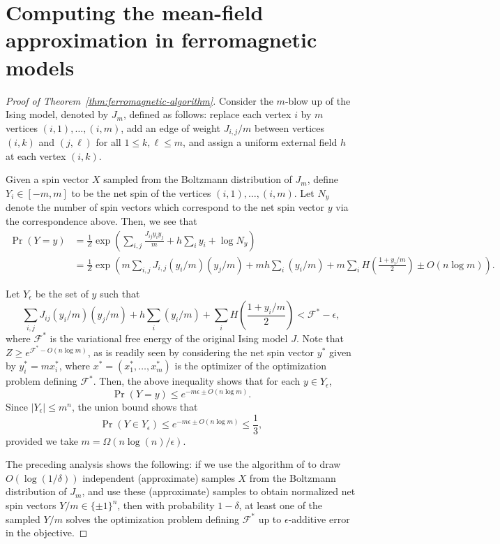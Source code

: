\documentclass[final, 12pt]{colt2018}
\newcommand{\F}{\mathcal{F}}
\theoremstyle{definition}
\theoremstyle{plain}
\begin{document}
\section{Computing the mean-field approximation in ferromagnetic models}
\begin{proof}[Proof of Theorem~\ref{thm:ferromagnetic-algorithm}]
Consider the $m$-blow up of the Ising model, denoted by $J_m$,  defined as follows: replace each vertex $i$ by $m$ vertices $(i,1),\dots,(i,m)$, add an edge of weight $J_{i,j}/m$ between vertices $(i,k)$ and $(j,\ell)$ for all $1\leq k,\ell \leq m$, and assign a uniform external field $h$ at each vertex $(i,k)$. 

Given a spin vector $X$ sampled from
the Boltzmann distribution of $J_m$, %
define $Y_i \in [-m,m]$ to be
the net spin of the vertices $(i,1),\dots, (i,m)$. %
Let $N_y$ denote the number of spin vectors which correspond
to the net spin vector $y$ via the correspondence above. Then, we see that
\begin{align*}
\Pr(Y = y) 
&= \frac{1}{Z}\exp\left(\sum_{i,j}\frac{J_{ij}y_iy_j}{m} + h \sum_i y_i + \log N_y\right) \\
&= \frac{1}{Z}\exp\left(m \sum_{i,j} J_{i,j} (y_i/m) (y_j/m) + m h \sum_i (y_i/m) + m \sum_i H\left(\frac{1 + y_i/m}{2}\right) \pm O(n\log m)\right).
\end{align*}

Let $Y_{\epsilon}$ be the set of $y$ such that
\[ \sum_{i,j} J_{ij} (y_i/m) (y_j/m) + h \sum_i (y_i/m) + \sum_i H\left(\frac{1 + y_i/m}{2}\right) < \mathcal{F}^* - \epsilon, \]
where $\mathcal{F}^*$ is the variational free energy
of the original Ising model $J$. Note that $Z \geq e^{\F^* - O(n\log{m})}$, as is readily seen by considering the net spin vector $y^*$ given by $y^*_i = mx^*_i$, where $x^* = (x^*_1,\dots, x^*_m)$ is the optimizer of the optimization problem defining $\F^*$.
Then, the above inequality shows that for each $y \in Y_{\epsilon}$,
\[ \Pr(Y = y) \le e^{-m \epsilon \pm O(n\log m)}.\]
Since $|Y_{\epsilon}| \le m^n$, the union bound shows that  
\[ \Pr(Y \in Y_{\epsilon}) \le e^{-m \epsilon \pm O(n\log m)} \leq \frac{1}{3},\]
provided we take $m = \Omega(n \log(n)/\epsilon)$. %

The preceding analysis shows the following: if we use the algorithm of \citep{JerrumSinclair:90} to draw
$O(\log(1/\delta))$ independent (approximate) samples $X$ from the Boltzmann distribution of $J_m$, and use these (approximate) samples to obtain normalized net spin vectors $Y/m \in \{\pm 1\}^n$, then with probability $1 - \delta$, at least one of the sampled $Y/m$ solves the optimization problem defining $\F^*$ up to $\epsilon$-additive error in the objective.
\end{proof}
\end{document}
